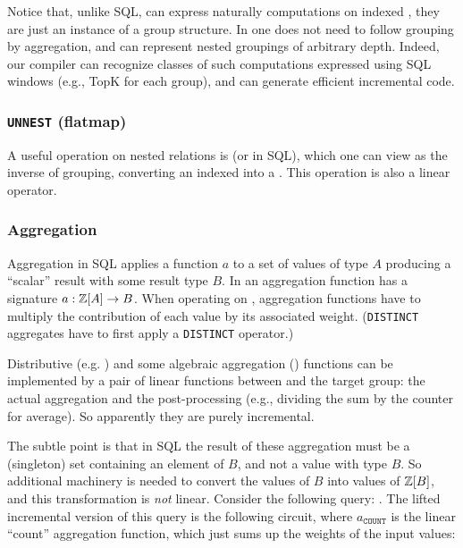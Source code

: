 Notice that, unlike SQL, \dbsp can express naturally computations on
indexed \zrs, they are just an instance of a group structure.  In
\dbsp one does not need to follow grouping by aggregation, and \dbsp
can represent nested groupings of arbitrary depth.  Indeed, our
compiler can recognize classes of such computations expressed using
SQL windows (e.g., TopK for each group), and can generate efficient
incremental code.


\subsubsection{\texttt{UNNEST} (flatmap)}

A useful operation on nested relations is  (or
 in SQL), which one can view as the inverse of grouping,
converting an indexed \zr into a \zr.  This operation is also a linear
\dbsp operator.

\subsubsection{Aggregation}\label{sec:aggregation}

Aggregation in SQL applies a function $a$ to a set of values of type
$A$ producing a ``scalar'' result with some result type $B$.  In \dbsp
an aggregation function has a signature $a: \mathbb{Z}[A] \to B$.  When
operating on \zrs, aggregation functions have to multiply the
contribution of each value by its associated weight.
(\texttt{DISTINCT} aggregates have to first apply a \texttt{DISTINCT}
operator.)

Distributive (e.g. ) and some algebraic aggregation
() functions can be implemented by a pair of linear
functions between \zrs and the target group: the actual aggregation
and the post-processing (e.g., dividing the sum by the counter for
average).  So apparently they are purely incremental.

The subtle point is that in SQL the result of these aggregation must
be a (singleton) set containing an element of $B$, and not a value
with type $B$.  So additional machinery is needed to convert the
values of $B$ into values of $\mathbb{Z}[B]$, and this transformation is
\emph{not} linear.  Consider the following query: .  The lifted incremental version of this query is
the following circuit, where $a_\texttt{COUNT}$ is the linear
``count'' aggregation function, which just sums up the weights of the
input values:


